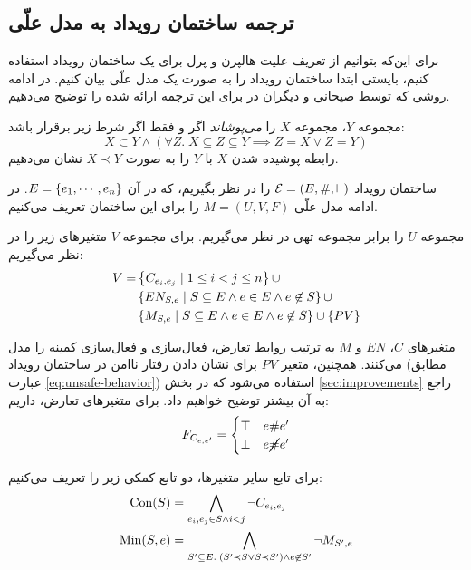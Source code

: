 \subsection{ترجمه ساختمان رویداد به مدل علّی}\label{sec:es-to-cm}

برای این‌که بتوانیم از تعریف علیت هالپرن و پرل
برای یک ساختمان رویداد استفاده کنیم، بایستی ابتدا
ساختمان رویداد را به صورت یک مدل علّی بیان کنیم. در ادامه
روشی که توسط صیحانی و دیگران در
\cite{seyhani2022}
برای این ترجمه ارائه شده را توضیح می‌دهیم.

\begin{definition}
  مجموعه $Y$،
  مجموعه $X$
  را \textit{می‌پوشاند}
  اگر و فقط اگر شرط زیر برقرار باشد:
  \begin{equation*}
    X \subset Y \wedge \left(
      \forall Z.\;
      X \subseteq Z \subseteq Y \implies Z=X \vee Z=Y 
    \right)
  \end{equation*}
  رابطه پوشیده شدن
  $X$ با $Y$
  را به صورت
  $X \prec Y$
  نشان می‌دهیم.
\end{definition}

ساختمان رویداد
$\mathcal{E}=(E,\#,\vdash)$
را در نظر بگیریم، که در آن
$E=\left\{ e_1,\cdots,e_n \right\}$.
در ادامه مدل علّی
$M=(U,V,F)$
را برای این ساختمان تعریف می‌کنیم.

مجموعه $U$
را برابر مجموعه تهی در نظر می‌گیریم.
برای مجموعه $V$
متغیرهای زیر را در نظر می‌گیریم:
\begin{align}
  V = & \left\{ C_{e_i,e_j} \mid 1 \leq i < j \leq n \right\} \cup \\
  & \left\{ 
    EN_{S,e} \mid
    S \subseteq E \wedge e \in E \wedge e \not\in S
   \right\} \cup \\
  & \left\{ 
    M_{S,e} \mid
    S \subseteq E \wedge e \in E \wedge e \not\in S
   \right\} \cup \left\{ PV \right\}
\end{align}

متغیرهای
$C$، $EN$ و $M$
به ترتیب روابط تعارض، فعال‌سازی و فعال‌سازی کمینه
را مدل می‌کنند. همچنین، متغیر
$PV$
برای نشان دادن رفتار ناامن در ساختمان رویداد
(مطابق عبارت \ref{eq:unsafe-behavior})
استفاده می‌شود که در بخش
\ref{sec:improvements}
راجع به آن بیشتر توضیح خواهیم داد.
برای متغیرهای تعارض، داریم:
\begin{equation*}
  F_{C_{e,e'}} = \begin{cases}
    \top  & e \# e' \\
    \bot  & e \cancel{\#} e'
  \end{cases}
\end{equation*}

برای تابع سایر متغیرها، دو تابع کمکی زیر را تعریف می‌کنیم:
\begin{align*}
  \operatorname{Con}(S) & =
  \bigwedge_{e_i,e_j \in S \wedge i < j} \neg C_{e_i,e_j} \\
  \operatorname{Min}(S,e) & = \bigwedge_{
    S' \subseteq E.\;
    (S' \prec S \vee S \prec S') \wedge e \not\in S'
  } \neg M_{S',e}
\end{align*}

